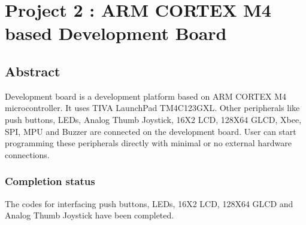 \documentclass[a4paper,12pt,oneside]{book}
\begin{document}



\chapter[Project Tag]{ Project 2 : ARM CORTEX M4 based Development Board}
\section*{Abstract}
Development board is a development platform based on ARM CORTEX M4 microcontroller. It uses TIVA LaunchPad TM4C123GXL. Other peripherals like push buttons, LEDs, Analog Thumb Joystick, 16X2 LCD, 128X64 GLCD, Xbee, SPI, MPU and Buzzer are connected on the development board. User can start programming these peripherals directly with minimal or no external hardware connections.  

\subsection*{Completion status}
The codes for interfacing push buttons, LEDs, 16X2 LCD, 128X64 GLCD and Analog Thumb Joystick have been completed.
\end{document}
